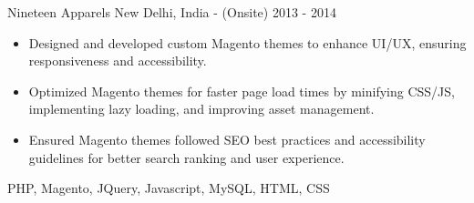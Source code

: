 \begin{projects}
    

    \project
    {Nineteen Apparels} {New Delhi, India - (Onsite)} {2013 - 2014}
    {}
    {\begin{itemize}
        \item Designed and developed custom Magento themes to enhance UI/UX, ensuring responsiveness and accessibility.
        \item Optimized Magento themes for faster page load times by minifying CSS/JS, implementing lazy loading, and improving asset management.
        \item Ensured Magento themes followed SEO best practices and accessibility guidelines for better search ranking and user experience.
    \end{itemize}}
    {PHP, Magento, JQuery, Javascript, MySQL, HTML, CSS}


\end{projects}
